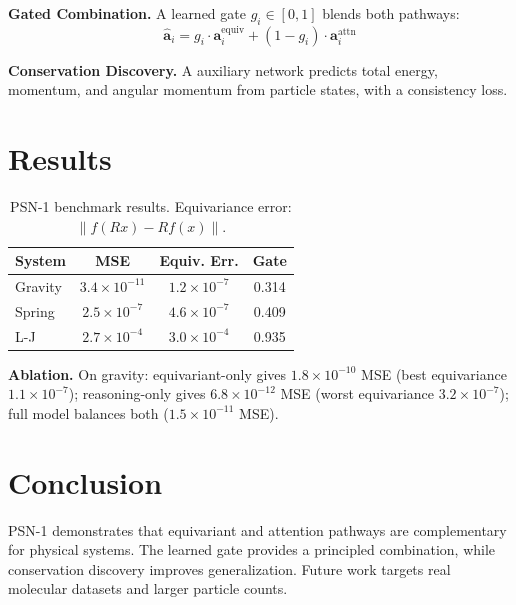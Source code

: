 \documentclass[conference]{IEEEtran}
\begin{document}
\textbf{Gated Combination.} A learned gate $g_i \in [0,1]$ blends both pathways:
\begin{equation}
\hat{\mathbf{a}}_i = g_i \cdot \mathbf{a}_i^{\text{equiv}} + (1-g_i) \cdot \mathbf{a}_i^{\text{attn}}
\end{equation}

\textbf{Conservation Discovery.} A auxiliary network predicts total energy, momentum, and angular momentum from particle states, with a consistency loss.

\section{Results}

\begin{table}[t]
\centering
\caption{PSN-1 benchmark results. Equivariance error: $\|f(Rx)-Rf(x)\|$.}
\label{tab:results}
\begin{tabular}{lccc}
\toprule
System & MSE & Equiv. Err. & Gate \\
\midrule
Gravity & $3.4\!\times\!10^{-11}$ & $1.2\!\times\!10^{-7}$ & 0.314 \\
Spring & $2.5\!\times\!10^{-7}$ & $4.6\!\times\!10^{-7}$ & 0.409 \\
L-J & $2.7\!\times\!10^{-4}$ & $3.0\!\times\!10^{-4}$ & 0.935 \\
\bottomrule
\end{tabular}
\end{table}

\textbf{Ablation.} On gravity: equivariant-only gives $1.8\times10^{-10}$ MSE (best equivariance $1.1\times10^{-7}$); reasoning-only gives $6.8\times10^{-12}$ MSE (worst equivariance $3.2\times10^{-7}$); full model balances both ($1.5\times10^{-11}$ MSE).

\section{Conclusion}
PSN-1 demonstrates that equivariant and attention pathways are complementary for physical systems. The learned gate provides a principled combination, while conservation discovery improves generalization. Future work targets real molecular datasets and larger particle counts.



\end{document}
